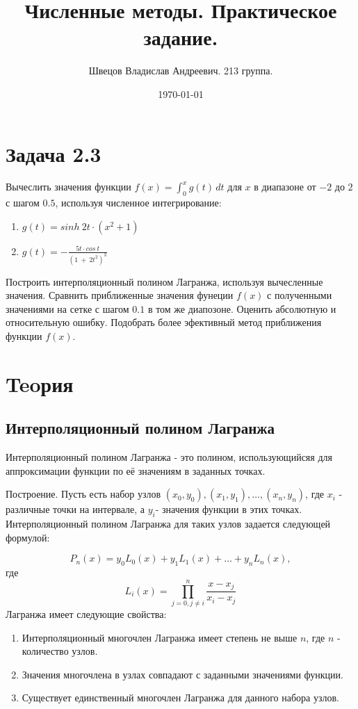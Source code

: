 \documentclass[13pt, a4paper, twoside]{article}
\title{Численные методы. Практическое задание.}
\author{Швецов Владислав Андреевич. 213 группа.}
\date{\today}
\begin{document}
\maketitle


\tab
\tab

\section{Задача 2.3}
\tab Вычеслить значения функции $f(x) = \int_{0}^{x} g(t) \,dt$ для $x$ в диапазоне от $-2$ до $2$ с шагом $0.5$, используя численное интегрирование:

\begin{enumerate}
    \item $g(t) = sinh\ 2t \cdot (x^2 + 1)$
    \item $g(t) = -\frac{5t\cdot cos\ t}{(1\ +\ 2t^2)^3} $
\end{enumerate}

Построить интерполяционный полином Лагранжа, используя вычесленные значения.
Сравнить приближенные значения фунеции $f(x)$ с полученными значениями на сетке с шагом $0.1$ в том же диапозоне. Оценить абсолютную и относительную ошибку.
Подобрать более эфективный метод приближения функции $f(x).$

\section{Teoрия}
\subsection{Интерполяционный полином Лагранжа}

\tub Интерполяционный полином Лагранжа \-- это полином, использующийсяя для аппроксимации функции по её значениям в заданных точках.

Построение. Пусть есть набор узлов \( (x_0, y_0), (x_1, y_1), \ldots, (x_n, y_n) \), где \( x_i \) \-- различные точки на интервале, а \( y_i \)\-- значения функции в этих точках.
Интерполяционный полином Лагранжа для таких узлов задается следующей формулой:

\[
P_n(x) = y_0 L_0(x) + y_1 L_1(x) + \ldots + y_n L_n(x),
\]где \[L_i(x) = \prod_{j=0, j\neq i}^{n} \frac{x - x_j}{x_i - x_j}\]
 Лагранжа имеет следующие свойства:
\begin{enumerate}
    \item Интерполяционный многочлен Лагранжа имеет степень не выше \( n \), где \( n \) - количество узлов.
    \item Значения многочлена в узлах совпадают с заданными значениями функции.
    \item Существует единственный многочлен Лагранжа для данного набора узлов.
\end{enumerate}
\end{document}
